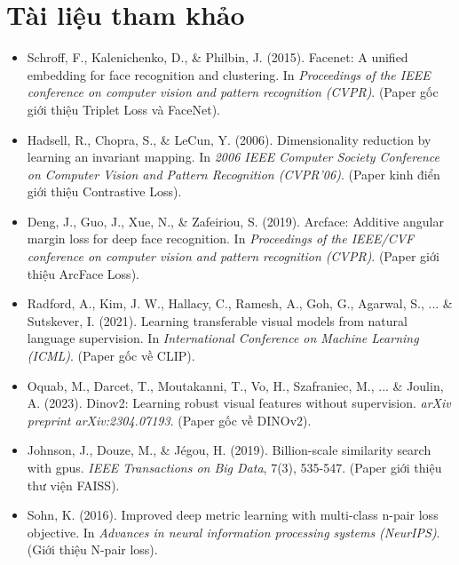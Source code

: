 \section*{Tài liệu tham khảo}
\begin{itemize}
	\item[1] Schroff, F., Kalenichenko, D., \& Philbin, J. (2015). Facenet: A unified embedding for face recognition and clustering. In \textit{Proceedings of the IEEE conference on computer vision and pattern recognition (CVPR)}. (Paper gốc giới thiệu Triplet Loss và FaceNet).
	\item[2] Hadsell, R., Chopra, S., \& LeCun, Y. (2006). Dimensionality reduction by learning an invariant mapping. In \textit{2006 IEEE Computer Society Conference on Computer Vision and Pattern Recognition (CVPR'06)}. (Paper kinh điển giới thiệu Contrastive Loss).
	\item[3] Deng, J., Guo, J., Xue, N., \& Zafeiriou, S. (2019). Arcface: Additive angular margin loss for deep face recognition. In \textit{Proceedings of the IEEE/CVF conference on computer vision and pattern recognition (CVPR)}. (Paper giới thiệu ArcFace Loss).
	\item[4] Radford, A., Kim, J. W., Hallacy, C., Ramesh, A., Goh, G., Agarwal, S., ... \& Sutskever, I. (2021). Learning transferable visual models from natural language supervision. In \textit{International Conference on Machine Learning (ICML)}. (Paper gốc về CLIP).
	\item[5] Oquab, M., Darcet, T., Moutakanni, T., Vo, H., Szafraniec, M., ... \& Joulin, A. (2023). Dinov2: Learning robust visual features without supervision. \textit{arXiv preprint arXiv:2304.07193}. (Paper gốc về DINOv2).
	\item[6] Johnson, J., Douze, M., \& Jégou, H. (2019). Billion-scale similarity search with gpus. \textit{IEEE Transactions on Big Data}, 7(3), 535-547. (Paper giới thiệu thư viện FAISS).
	\item[7] Sohn, K. (2016). Improved deep metric learning with multi-class n-pair loss objective. In \textit{Advances in neural information processing systems (NeurIPS)}. (Giới thiệu N-pair loss).
\end{itemize}